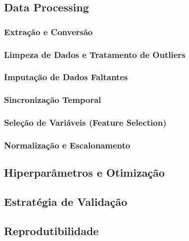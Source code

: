 \documentclass[12pt,a4paper]{article}
\begin{document}
\subsection{Data Processing}

\subsubsection{Extração e Conversão}

\subsubsection{Limpeza de Dados e Tratamento de Outliers}


\subsubsection{Imputação de Dados Faltantes}

\subsubsection{Sincronização Temporal}

\subsubsection{Seleção de Variáveis (Feature Selection)}


\subsubsection{Normalização e Escalonamento}

\subsection{Hiperparâmetros e Otimização}


\subsection{Estratégia de Validação}

\subsection{Reprodutibilidade}
\end{document}
